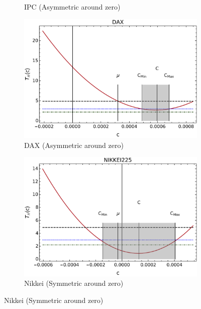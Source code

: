 \documentclass{elsarticle}
\begin{document}
\begin{figure}[h!tb]
\begin{subfigure}[b]{0.45\textwidth}
            \caption[ ]%
            {{\small IPC (Asymmetric around zero)}}
            \label{fig:RetsFigsIPC}
        \end{subfigure}
        \begin{subfigure}[b]{0.45\textwidth}
            \centering 
            \includegraphics[width=\textwidth]{figures/SymmetryPlots/simetria_retornos_simples_DAX.pdf}
            \caption[]%
            {{\small DAX (Asymmetric around zero)}}
            \label{fig:RetsFigsDAX}
        \end{subfigure}
        \quad
        \begin{subfigure}[b]{0.45\textwidth}
            \centering 
            \includegraphics[width=\textwidth]{figures/SymmetryPlots/simetria_retornos_simples_NIKKEI.pdf}
            \caption[]%
            {{\small Nikkei (Symmetric around zero)}}

\end{subfigure}
\end{figure}
\end{document}
